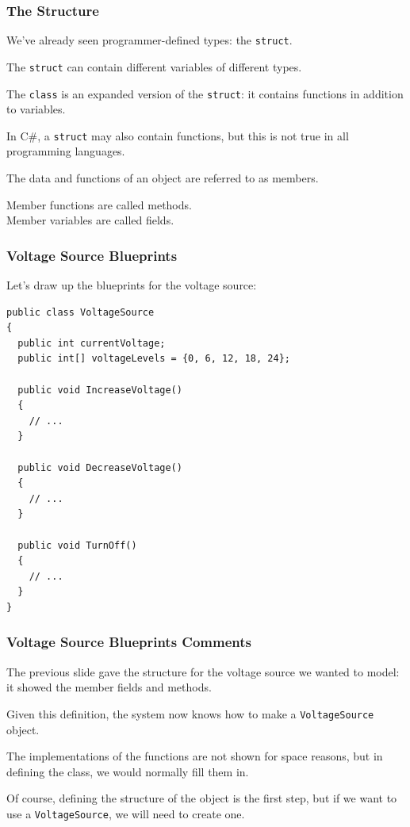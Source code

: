\begin{frame}
\frametitle{The Structure}

We've already seen programmer-defined types: the \texttt{struct}.

The \texttt{struct} can contain different variables of different types.

The \texttt{class} is an expanded version of the \texttt{struct}: it contains functions in addition to variables.

In C\#, a \texttt{struct} may also contain functions, but this is not true in all programming languages.

The data and functions of an object are referred to as \alert{members}.

Member functions are called \alert{methods}.\\
Member variables are called \alert{fields}.

\end{frame}


\begin{frame}[fragile]
\frametitle{Voltage Source Blueprints}

Let's draw up the blueprints for the voltage source:
{\scriptsize
\begin{verbatim}
public class VoltageSource
{
  public int currentVoltage;
  public int[] voltageLevels = {0, 6, 12, 18, 24};

  public void IncreaseVoltage()
  {
    // ...
  }
  
  public void DecreaseVoltage()
  {
    // ...
  }
  
  public void TurnOff()
  {
    // ...
  }
}
\end{verbatim}
}

\end{frame}

\begin{frame}
\frametitle{Voltage Source Blueprints Comments}

The previous slide gave the structure for the voltage source we wanted to model: it showed the member fields and methods.

Given this definition, the system now knows how to make a \texttt{VoltageSource} object.

The implementations of the functions are not shown for space reasons, but in defining the class, we would normally fill them in.

Of course, defining the structure of the object is the first step, but if we want to use a \texttt{VoltageSource}, we will need to create one.

\end{frame}


